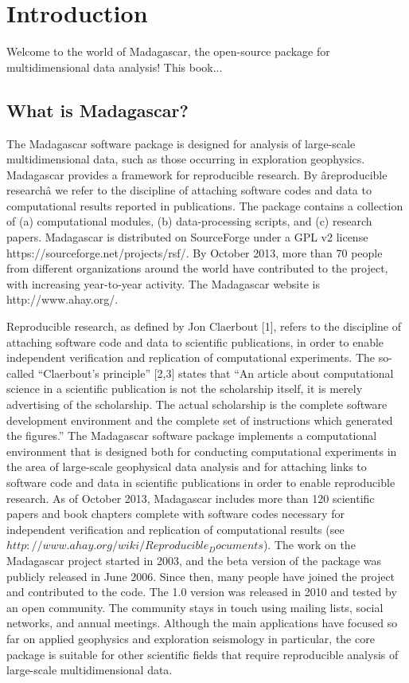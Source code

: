 \chapter{Introduction}

Welcome to the world of Madagascar, the open-source package for
multidimensional data analysis! This book...

\section{What is Madagascar?}

The Madagascar software package is designed for analysis of
large-scale multidimensional data, such as those occurring in
exploration geophysics. Madagascar provides a framework for
reproducible research. By âreproducible researchâ we
refer to the discipline of attaching software codes and data to
computational results reported in publications. The package contains a
collection of (a) computational modules, (b) data-processing scripts,
and (c) research papers. Madagascar is distributed on SourceForge
under a GPL v2 license https://sourceforge.net/projects/rsf/. By
October 2013, more than 70 people from different organizations around
the world have contributed to the project, with increasing
year-to-year activity. The Madagascar website is http://www.ahay.org/.

Reproducible research, as defined by Jon Claerbout [1], refers to the
discipline of attaching software code and data to scientific
publications, in order to enable independent verification and
replication of computational experiments. The so-called
``Claerbout's principle'' [2,3] states that
``An article about computational science in a scientific
publication is not the scholarship itself, it is merely advertising of
the scholarship. The actual scholarship is the complete software
development environment and the complete set of instructions which
generated the figures.'' The Madagascar software package
implements a computational environment that is designed both for
conducting computational experiments in the area of large-scale
geophysical data analysis and for attaching links to software code and
data in scientific publications in order to enable reproducible
research. As of October 2013, Madagascar includes more than 120
scientific papers and book chapters complete with software codes
necessary for independent verification and replication of
computational results (see
$http://www.ahay.org/wiki/Reproducible_Documents$).  The work on the
Madagascar project started in 2003, and the beta version of the
package was publicly released in June 2006. Since then, many people
have joined the project and contributed to the code. The 1.0 version
was released in 2010 and tested by an open community. The community
stays in touch using mailing lists, social networks, and annual
meetings.  Although the main applications have focused so far on
applied geophysics and exploration seismology in particular, the core
package is suitable for other scientific fields that require
reproducible analysis of large-scale multidimensional data.

